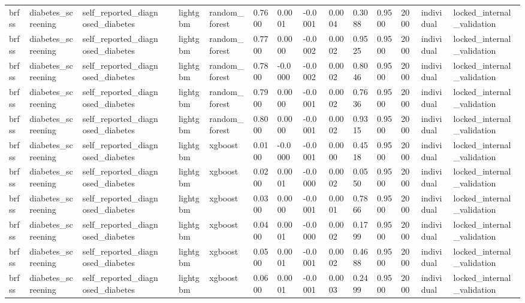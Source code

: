 \begin{tabular}{lllllllllllllll}
brfss & diabetes\_screening & self\_reported\_diagnosed\_diabetes &  & lightgbm & random\_forest & 0.7600 & 0.0001 & -0.0001 & 0.0004 & 0.3088 & 0.9500 & 2000 & individual & locked\_internal\_validation \\
brfss & diabetes\_screening & self\_reported\_diagnosed\_diabetes &  & lightgbm & random\_forest & 0.7700 & 0.0000 & -0.0002 & 0.0002 & 0.9525 & 0.9500 & 2000 & individual & locked\_internal\_validation \\
brfss & diabetes\_screening & self\_reported\_diagnosed\_diabetes &  & lightgbm & random\_forest & 0.7800 & -0.0000 & -0.0002 & 0.0002 & 0.8046 & 0.9500 & 2000 & individual & locked\_internal\_validation \\
brfss & diabetes\_screening & self\_reported\_diagnosed\_diabetes &  & lightgbm & random\_forest & 0.7900 & 0.0000 & -0.0001 & 0.0002 & 0.7636 & 0.9500 & 2000 & individual & locked\_internal\_validation \\
brfss & diabetes\_screening & self\_reported\_diagnosed\_diabetes &  & lightgbm & random\_forest & 0.8000 & 0.0000 & -0.0001 & 0.0002 & 0.9315 & 0.9500 & 2000 & individual & locked\_internal\_validation \\
brfss & diabetes\_screening & self\_reported\_diagnosed\_diabetes &  & lightgbm & xgboost & 0.0100 & -0.0000 & -0.0001 & 0.0000 & 0.4518 & 0.9500 & 2000 & individual & locked\_internal\_validation \\
brfss & diabetes\_screening & self\_reported\_diagnosed\_diabetes &  & lightgbm & xgboost & 0.0200 & 0.0001 & -0.0000 & 0.0002 & 0.0550 & 0.9500 & 2000 & individual & locked\_internal\_validation \\
brfss & diabetes\_screening & self\_reported\_diagnosed\_diabetes &  & lightgbm & xgboost & 0.0300 & 0.0000 & -0.0001 & 0.0001 & 0.7866 & 0.9500 & 2000 & individual & locked\_internal\_validation \\
brfss & diabetes\_screening & self\_reported\_diagnosed\_diabetes &  & lightgbm & xgboost & 0.0400 & 0.0001 & -0.0000 & 0.0002 & 0.1799 & 0.9500 & 2000 & individual & locked\_internal\_validation \\
brfss & diabetes\_screening & self\_reported\_diagnosed\_diabetes &  & lightgbm & xgboost & 0.0500 & 0.0001 & -0.0001 & 0.0002 & 0.4688 & 0.9500 & 2000 & individual & locked\_internal\_validation \\
brfss & diabetes\_screening & self\_reported\_diagnosed\_diabetes &  & lightgbm & xgboost & 0.0600 & 0.0001 & -0.0001 & 0.0003 & 0.2499 & 0.9500 & 2000 & individual & locked\_internal\_validation \\

\end{tabular}
